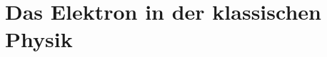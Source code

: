 \chapter{Das Elektron in der klassischen Physik}
\label{chap:elektron-klassische-physik}




\label{sec:elektron-geladener-massepunkt}

\label{sec:lorentzkraft}

\label{sec:kreisbahnen-ablenkung-klassische-bewegung}

\label{sec:strahlungsprozesse-beschleunigter-elektronen}

\label{subsec:bremsstrahlung}

\label{subsec:synchrotronstrahlung}

\label{sec:klassische-leitfaehigkeit}

\label{sec:grenzen-klassisches-elektronenbild}